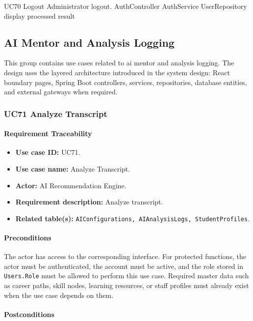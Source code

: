 \SequenceDiagram
{UC70 Logout}
{Administrator}
{logout.}
{AuthController}
{AuthService}
{UserRepository}
{display processed result}

\subsection{AI Mentor and Analysis Logging}

This group contains use cases related to ai mentor and analysis logging. The design uses the layered architecture introduced in the system design: React boundary pages, Spring Boot controllers, services, repositories, database entities, and external gateways when required.

\subsubsection{UC71 Analyze Transcript}

\paragraph{Requirement Traceability}

\begin{itemize}
    \item \textbf{Use case ID:} UC71.
    \item \textbf{Use case name:} Analyze Transcript.
    \item \textbf{Actor:} AI Recommendation Engine.
    \item \textbf{Requirement description:} Analyze transcript.
    \item \textbf{Related table(s):} \texttt{AIConfigurations, AIAnalysisLogs, StudentProfiles}.
\end{itemize}

\paragraph{Preconditions}

The actor has access to the corresponding interface. For protected functions, the actor must be authenticated, the account must be active, and the role stored in \texttt{Users.Role} must be allowed to perform this use case. Required master data such as career paths, skill nodes, learning resources, or staff profiles must already exist when the use case depends on them.

\paragraph{Postconditions}


